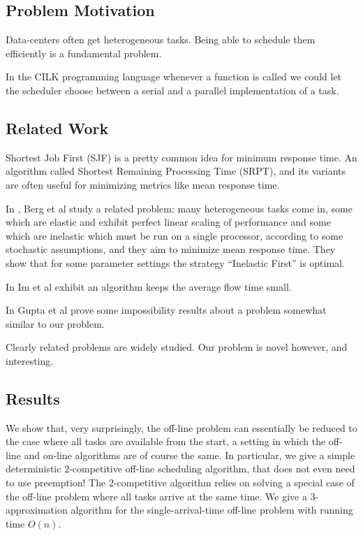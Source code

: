 
\subsection{Problem Motivation}
Data-centers often get heterogeneous tasks. Being able to schedule
them efficiently is a fundamental problem. 

In the CILK programming language whenever a function is called we
could let the scheduler choose between a serial and a parallel
implementation of a task. 

\subsection{Related Work}
Shortest Job First (SJF) is a pretty common idea for minimum response time. 
An algorithm called Shortest Remaining Processing Time (SRPT),
and its variants are often useful for minimizing metrics like mean
response time.

In \cite{bb20}, Berg et al study a related problem:
many heterogeneous tasks come in, some which are elastic and
exhibit perfect linear scaling of performance and some which are
inelastic which must be run on a single processor, according to
some stochastic assumptions, and they aim to minimize mean
response time. They show that for some parameter settings the
strategy \enquote{Inelastic First} is optimal.

In \cite{is16} Im et al exhibit an algorithm keeps the average
flow time small. 

In \cite{ga12} Gupta et al prove some impossibility results about
a problem somewhat similar to our problem.

Clearly related problems are widely studied.
Our problem is novel however, and interesting.

\subsection{Results}
We show that, very surprisingly, the off-line problem can
essentially be reduced to the case where all tasks are available
from the start, a setting in which the off-line and on-line
algorithms are of course the same. In particular, we give a
simple deterministic $2$-competitive off-line scheduling
algorithm, that does not even need to use preemption! The
$2$-competitive algorithm relies on solving a special case of the
off-line problem where all tasks arrive at the same time. We give
a $3$-approximation algorithm for the single-arrival-time
off-line problem with running time $O(n)$.

